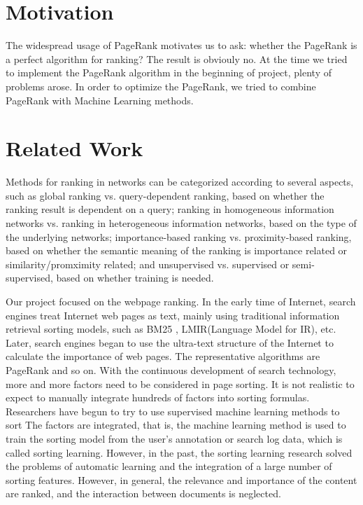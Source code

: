 \documentclass{acmtog} %
\begin{document}
\section{Motivation}
The widespread usage of PageRank motivates us to ask: whether the PageRank is a perfect algorithm for ranking? The result is obviouly no. At the time we tried to implement the PageRank algorithm in the beginning of project, plenty of problems arose. In order to optimize the PageRank, we tried to combine PageRank with Machine Learning methods.

\section{Related Work}
Methods for ranking in networks can be categorized according to several aspects, such as global ranking vs. query-dependent ranking, based on whether the ranking result is dependent on a query; ranking in homogeneous information networks vs. ranking in heterogeneous information networks, based on the type of the underlying networks; importance-based ranking vs. proximity-based ranking, based on whether the semantic meaning of the ranking is importance related or similarity/promximity related; and unsupervised vs. supervised or semi-supervised, based on whether training is needed.

Our project focused on the webpage ranking. In the early time of Internet, search engines treat Internet web pages as text, mainly using traditional information retrieval sorting models, such as BM25\cite{ref4}
, LMIR(Language Model for IR)\cite{ref5}, etc. Later, search engines began to use the ultra-text structure of the Internet to calculate the importance of web pages. The representative algorithms are PageRank and so on. With the continuous development of search technology, more and more factors need to be considered in page sorting. It is not realistic to expect to manually integrate hundreds of factors into sorting formulas. Researchers have begun to try to use supervised machine learning methods to sort The factors are integrated, that is, the machine learning method is used to train the sorting model from the user's annotation or search log data, which is called sorting learning. However, in the past, the sorting learning research solved the problems of automatic learning and the integration of a large number of sorting features. However, in general, the relevance and importance of the content are ranked, and the interaction between documents is neglected.
\end{document}
